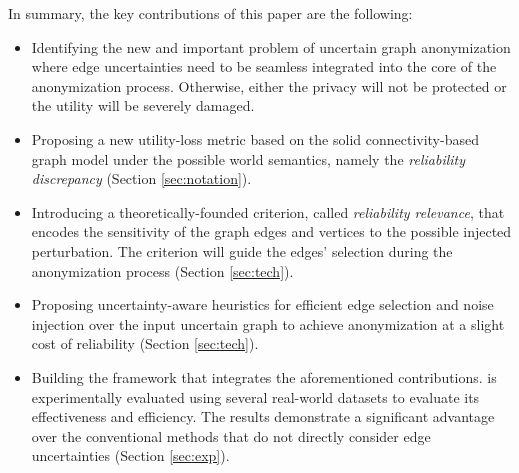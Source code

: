 In summary, the key contributions of this paper are the following:
\begin{itemize}
\itemsep0em 
\item{Identifying  the new and important problem of uncertain graph anonymization where edge uncertainties need to be seamless 
	integrated into the core of the anonymization process. Otherwise, either the  privacy will not be protected or the  utility will be severely damaged.    
}

\item{Proposing a new utility-loss metric based on the solid connectivity-based graph model under the possible world semantics, namely the {\em reliability discrepancy} (Section \ref{sec:notation}).}

\item{Introducing a theoretically-founded criterion, called {\em reliability relevance}, that encodes the sensitivity of the graph edges and vertices to 
	the possible injected perturbation. The criterion will guide the edges' selection during the anonymization process (Section \ref{sec:tech}).}

\item{Proposing uncertainty-aware heuristics for efficient edge selection and noise injection over the input uncertain graph  to achieve anonymization  
at  a slight cost of reliability  (Section \ref{sec:tech}).}


\item{Building  the \SysName framework that integrates the aforementioned contributions. \SysName is experimentally evaluated using several real-world datasets 
	to evaluate its effectiveness and efficiency. 
	The results demonstrate a significant advantage over the conventional methods that do not directly consider edge uncertainties (Section \ref{sec:exp}).}




      

\end{itemize}
